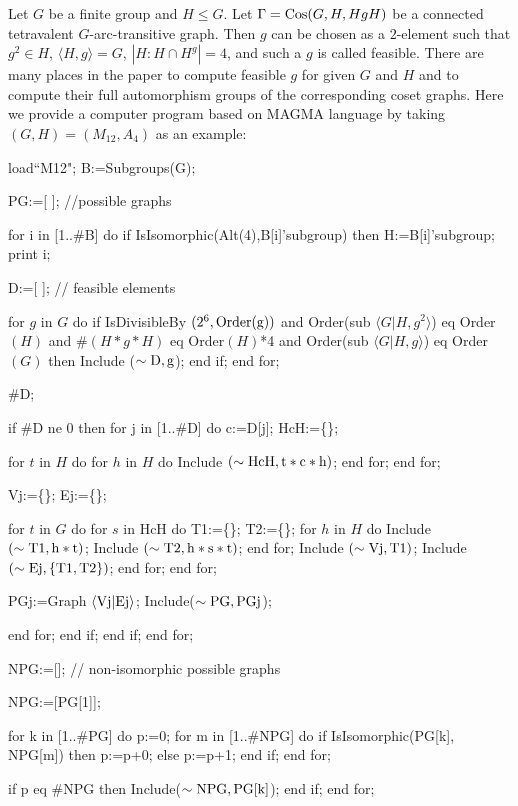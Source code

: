 \documentclass[12pt]{article}
\def\f{\noindent}
\def\Cos{\hbox{\rm Cos}}
\begin{document}
\vskip 0.2cm

Let $G$ be a finite group and $H\leq G$. Let $\G=\Cos(G,H,HgH)$ be a connected tetravalent $G$-arc-transitive graph. Then $g$ can be chosen as a $2$-element such that
$g^2\in H$, $\langle H,g\rangle=G$, $|H:H\cap H^g|=4$, and such a $g$ is called feasible. There are many places in the paper to compute feasible $g$ for given $G$ and $H$ and to compute their full automorphism groups of the corresponding coset graphs. Here we provide a computer program based on MAGMA language by taking $(G,H)=(M_{12}, A_4)$ as an example:


\medskip
\f load``M12";
   B:=Subgroups(G);

\medskip
\f PG:=[ ]; //possible graphs

\medskip
\f for i in [1..\#B] do if IsIsomorphic(\rm Alt(4),B[i]'subgroup) then
H:=B[i]'subgroup; print i;

\medskip
\f D:=[ ]; // feasible elements

\medskip
\f for $g$ in $G$ do
   if IsDivisibleBy $(2^6,\rm Order(g))$ and Order(sub $\langle G| H,g^2\rangle$) eq Order$(H)$ and \#$(H*g*H)$ eq Order$(H)$*4 and Order(sub $\langle G| H, g\rangle$) eq Order$(G)$ then Include ($\sim\rm D,g$);
  end if;
 end for;

\medskip
\f \#D;

\medskip
\f if \#D ne 0 then for j in [1..\#D] do
c:=D[j]; HcH:=\{\};

\medskip
\f for $t$ in $H$ do
for $h$ in $H$ do
Include $(\sim \rm HcH, t*c*h)$;
end for; end for;

\medskip

\f Vj:=\{\}; Ej:=\{\};

\f for $t$ in $G$ do for $s$ in HcH do
T1:=\{\}; T2:=\{\}; for $h$ in $H$ do
Include $(\sim \rm T1, h*t)$; Include $(\sim \rm T2, h*s*t)$; end for; Include $(\sim \rm Vj, T1)$; Include $(\sim \rm Ej, \{T1,T2\})$; end for; end for;

\medskip
\f PGj:=Graph $\langle \rm Vj | \rm Ej \rangle$;
Include($\sim \rm PG,PGj$);

\f end for; end if; end if; end for;

\medskip
\f NPG:=[]; // non-isomorphic possible graphs

\medskip
\f NPG:=[PG[1]];

\f for k in [1..\#PG] do
p:=0;
      for m in [1..\#NPG] do
        if IsIsomorphic(PG[k], NPG[m]) then
         p:=p+0;
        else p:=p+1;
     end if;
     end for;

\f if p eq \#NPG then
  Include($\sim \rm NPG,PG[k]$);
end if;
end for;
\end{document}
